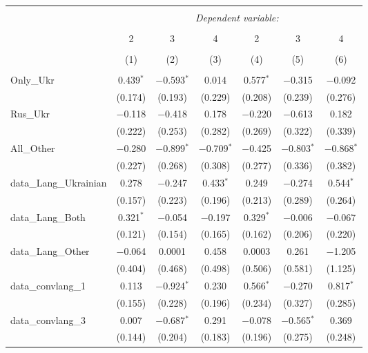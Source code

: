 
\begin{table}[!htbp] \centering 
  \caption{} 
  \label{} 
\tiny 
\begin{tabular}{@{\extracolsep{1pt}}lcccccc} 
\\[-1.8ex]\hline 
\hline \\[-1.8ex] 
 & \multicolumn{6}{c}{\textit{Dependent variable:}} \\ 
\cline{2-7} 
\\[-1.8ex] & 2 & 3 & 4 & 2 & 3 & 4 \\ 
\\[-1.8ex] & (1) & (2) & (3) & (4) & (5) & (6)\\ 
\hline \\[-1.8ex] 
 Only\_Ukr & 0.439$^{*}$ & $-$0.593$^{*}$ & 0.014 & 0.577$^{*}$ & $-$0.315 & $-$0.092 \\ 
  & (0.174) & (0.193) & (0.229) & (0.208) & (0.239) & (0.276) \\ 
  Rus\_Ukr & $-$0.118 & $-$0.418 & 0.178 & $-$0.220 & $-$0.613 & 0.182 \\ 
  & (0.222) & (0.253) & (0.282) & (0.269) & (0.322) & (0.339) \\ 
  All\_Other & $-$0.280 & $-$0.899$^{*}$ & $-$0.709$^{*}$ & $-$0.425 & $-$0.803$^{*}$ & $-$0.868$^{*}$ \\ 
  & (0.227) & (0.268) & (0.308) & (0.277) & (0.336) & (0.382) \\ 
  data\_Lang\_Ukrainian & 0.278 & $-$0.247 & 0.433$^{*}$ & 0.249 & $-$0.274 & 0.544$^{*}$ \\ 
  & (0.157) & (0.223) & (0.196) & (0.213) & (0.289) & (0.264) \\ 
  data\_Lang\_Both & 0.321$^{*}$ & $-$0.054 & $-$0.197 & 0.329$^{*}$ & $-$0.006 & $-$0.067 \\ 
  & (0.121) & (0.154) & (0.165) & (0.162) & (0.206) & (0.220) \\ 
  data\_Lang\_Other & $-$0.064 & 0.0001 & 0.458 & 0.0003 & 0.261 & $-$1.205 \\ 
  & (0.404) & (0.468) & (0.498) & (0.506) & (0.581) & (1.125) \\ 
  data\_convlang\_1 & 0.113 & $-$0.924$^{*}$ & 0.230 & 0.566$^{*}$ & $-$0.270 & 0.817$^{*}$ \\ 
  & (0.155) & (0.228) & (0.196) & (0.234) & (0.327) & (0.285) \\ 
  data\_convlang\_3 & 0.007 & $-$0.687$^{*}$ & 0.291 & $-$0.078 & $-$0.565$^{*}$ & 0.369 \\ 
  & (0.144) & (0.204) & (0.183) & (0.196) & (0.275) & (0.248) \\ 

\end{tabular}
\end{table}

